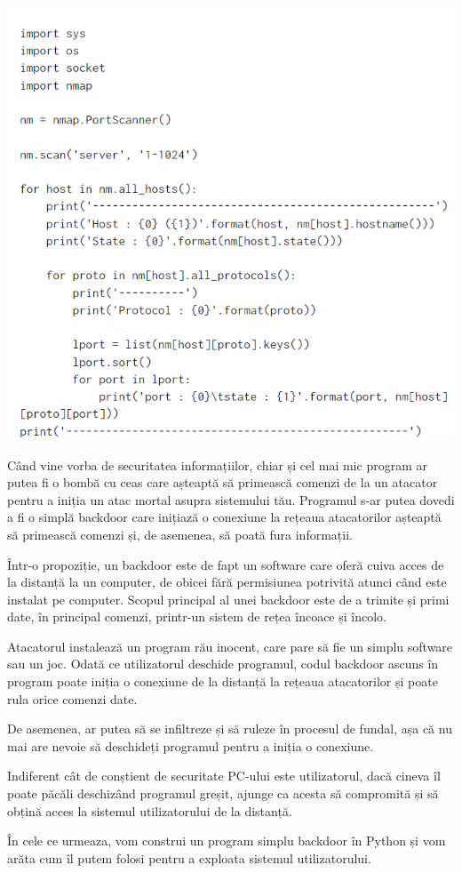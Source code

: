 \documentclass[oneside,20pt]{article}          %
\begin{document}
  \begin{center}
\includegraphics[height=7 cm]{3.png}
\end{center}
Când vine vorba de securitatea informațiilor, chiar și cel mai mic program ar putea fi o bombă cu ceas care așteaptă să primească comenzi de la un atacator pentru a iniția un atac mortal asupra sistemului tău. Programul s-ar putea dovedi a fi o simplă backdoor care inițiază o conexiune la rețeaua atacatorilor așteaptă să primească comenzi și, de asemenea, să poată fura informații.

 

Într-o propoziție, un backdoor este de fapt un software care oferă cuiva acces de la distanță la un computer, de obicei fără permisiunea potrivită atunci când este instalat pe computer. Scopul principal al unei backdoor este de a trimite și primi date, în principal comenzi, printr-un sistem de rețea încoace și încolo.

 

Atacatorul instalează un program rău inocent, care pare să fie un simplu software sau un joc. Odată ce utilizatorul deschide programul, codul backdoor ascuns în program poate iniția o conexiune de la distanță la rețeaua atacatorilor și poate rula orice comenzi date.

 

De asemenea, ar putea să se infiltreze și să ruleze în procesul de fundal, așa că nu mai are nevoie să deschideți programul pentru a iniția o conexiune.


Indiferent cât de conștient de securitate PC-ului este utilizatorul, dacă cineva îl poate păcăli deschizând programul greșit, ajunge ca acesta să compromită și să obțină acces la sistemul utilizatorului de la distanță.

 

În cele ce urmeaza, vom construi un program simplu backdoor în Python și vom arăta cum îl putem folosi pentru a exploata sistemul utilizatorului.
\end{document}
